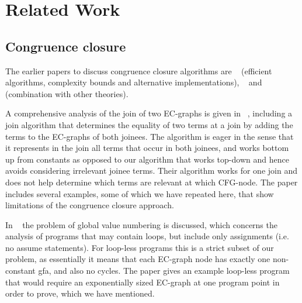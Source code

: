 \section{Related Work}


\subsection{Congruence closure}
The earlier papers to discuss congruence closure algorithms are ~\cite{DowneySethiTarjan} (efficient algorithms, complexity bounds and alternative implementations), ~\cite{Shostak84} and ~\cite{NelsonOppen80} (combination with other theories). 

A comprehensive analysis of the join of two EC-graphs is given in ~\cite{GulwaniTiwariNecula04}, including a join algorithm that determines the equality of two terms at a join by adding the terms to the EC-graphs of both joinees. 
The algorithm is eager in the sense that it represents in the join all terms that occur in both joinees, 
and works bottom up from constants as opposed to our algorithm that works top-down and hence avoids considering irrelevant joinee terms.
Their algorithm works for one join and does not help determine which terms are relevant at which CFG-node.
The paper includes several examples, some of which we have repeated here, that show limitations of the congruence closure approach.

In ~\cite{GulwaniNecula07} the problem of global value numbering is discussed, 
which concerns the analysis of programs that may contain loops, but include only assignments (i.e. no assume statements).
For loop-less programs this is a strict subset of our problem, as essentially it means that each EC-graph node has exactly one non-constant gfa, and also no cycles. The paper gives an example loop-less program that would require an exponentially sized EC-graph at one program point in order to prove, which we have mentioned.

